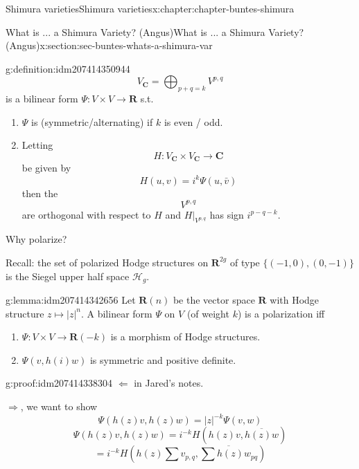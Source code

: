 \documentclass[oneside,10pt,]{book}
\numberwithin{equation}{section}
\newcommand{\RR}{\mathbf{R}}
\newcommand{\CC}{\mathbf{C}}
\begin{document}
\begin{chapterptx}{Shimura varieties}{}{Shimura varieties}{}{}{x:chapter:chapter-buntes-shimura}
\begin{sectionptx}{What is ... a Shimura Variety? (Angus)}{}{What is ... a Shimura Variety? (Angus)}{}{}{x:section:sec-buntes-whats-a-shimura-var}
\begin{definition}{}{g:definition:idm207414350944}
\begin{equation*}
V_\CC = \bigoplus_{p+q = k} V^{p,q}
\end{equation*}
is a bilinear form \(\Psi\colon V\times V \to \RR\) s.t.%
\begin{enumerate}
\item{}\(\Psi\) is (symmetric\slash{}alternating) if \(k\) is even \slash{} odd.%
\item{}Letting%
\begin{equation*}
H\colon V_\CC \times V_\CC \to \CC
\end{equation*}
be given by%
\begin{equation*}
H(u,v) = i^k \Psi(u, \bar v)
\end{equation*}
then the%
\begin{equation*}
V^{p,q}
\end{equation*}
are orthogonal with respect to \(H\) and \(H|_{V^{p,q}}\) has sign \(i^{p-q- k}\).%
\end{enumerate}
%
\end{definition}
Why polarize?%
\par
Recall: the set of polarized Hodge structures on \(\RR^{2g}\) of type \(\{(-1,0), (0,-1)\}\) is the Siegel upper half space \(\mathcal H_g\).%
\begin{lemma}{}{}{g:lemma:idm207414342656}%
Let \(\RR(n) \) be the vector space \(\RR\) with Hodge structure \(z\mapsto |z|^n\). A bilinear form \(\Psi\) on \(V\) (of weight \(k\)) is a polarization iff%
\begin{enumerate}
\item{}\(\Psi\colon V\times V \to \RR(-k)\) is a morphism of  Hodge structures.%
\item{}\(\Psi(v, h(i) w)\) is symmetric and positive definite.%
\end{enumerate}
%
\end{lemma}
\begin{proofptx}{}{g:proof:idm207414338304}
\(\Leftarrow\) in Jared's notes.%
\par
\(\Rightarrow\), we want to show%
\begin{equation*}
\Psi(h(z) v, h(z) w) = |z|^{-k} \Psi(v,w)
\end{equation*}
%
\begin{equation*}
\Psi(h(z) v, h(z) w) = i^{-k} H(h(z) v, \overline{h(z) w})
\end{equation*}
%
\begin{equation*}
=  i^{-k} H(h(z) \sum v_{p,q}, \overline { \sum h(z) w_{pq}})
\end{equation*}
%
\begin{equation*}

\end{equation*}
\end{proofptx}
\end{sectionptx}
\end{chapterptx}
\end{document}

